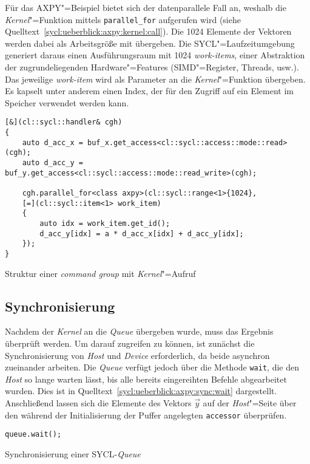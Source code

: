 Für das AXPY"=Beispiel bietet sich der datenparallele Fall an, weshalb die
\textit{Kernel}"=Funktion mittels \texttt{parallel\_for} aufgerufen wird (siehe
Quelltext~\ref{sycl:ueberblick:axpy:kernel:call}). Die \num{1024} Elemente der
Vektoren werden dabei als Arbeitsgröße mit übergeben. Die SYCL"=Laufzeitumgebung
generiert daraus einen Ausführungsraum mit \num{1024} \textit{work-items}, einer
Abstraktion der zugrundeliegenden Hardware"=Features (SIMD"=Register, Threads,
usw.). Das jeweilige \textit{work-item} wird als Parameter an die
\textit{Kernel}"=Funktion übergeben. Es kapselt unter anderem einen Index, der
für den Zugriff auf ein Element im Speicher verwendet werden kann. 

\begin{code}
    \begin{verbatim}
[&](cl::sycl::handler& cgh)
{
    auto d_acc_x = buf_x.get_access<cl::sycl::access::mode::read>(cgh);
    auto d_acc_y = buf_y.get_access<cl::sycl::access::mode::read_write>(cgh);

    cgh.parallel_for<class axpy>(cl::sycl::range<1>{1024},
    [=](cl::sycl::item<1> work_item)
    {
        auto idx = work_item.get_id();
        d_acc_y[idx] = a * d_acc_x[idx] + d_acc_y[idx];
    });
}
    \end{verbatim}
    \caption{Struktur einer \textit{command group} mit \textit{Kernel}"=Aufruf}
    \label{sycl:ueberblick:axpy:kernel:call}
\end{code}

\subsection{Synchronisierung}
\label{sycl:ueberblick:axpy:sync}

Nachdem der \textit{Kernel} an die \textit{Queue} übergeben wurde, muss das
Ergebnis überprüft werden. Um darauf zugreifen zu können, ist zunächst die
Synchronisierung von \textit{Host} und \textit{Device} erforderlich, da beide
asynchron zueinander arbeiten. Die \textit{Queue} verfügt jedoch über die
Methode \texttt{wait}, die den \textit{Host} so lange warten lässt, bis alle
bereits eingereihten Befehle abgearbeitet wurden. Dies ist in
Quelltext~\ref{sycl:ueberblick:axpy:sync:wait} dargestellt. Anschließend
lassen sich die Elemente des Vektors $\vec{y}$ auf der \textit{Host}"=Seite
über den während der Initialisierung der Puffer angelegten \texttt{accessor}
überprüfen.

\begin{code}
    \begin{verbatim}
queue.wait();
    \end{verbatim}
    \caption{Synchronisierung einer SYCL-\textit{Queue}}
    \label{sycl:ueberblick:axpy:sync:wait}
\end{code}

